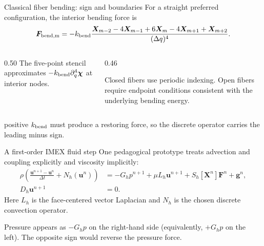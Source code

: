 \documentclass[aspectratio=169,11pt]{beamer}
\newcommand{\uvec}{\bm{u}}
\newcommand{\Xvec}{\bm{X}}
\newcommand{\Fvec}{\bm{F}}
\begin{document}
\begin{frame}{Classical fiber bending: sign and boundaries}
For a straight preferred configuration, the interior bending force is
\[
 \Fvec_{\rm bend,m}=-k_{\rm bend}
 \frac{\Xvec_{m-2}-4\Xvec_{m-1}+6\Xvec_m-4\Xvec_{m+1}+\Xvec_{m+2}}
      {(\Delta q)^4}.
\]
\begin{columns}[T,onlytextwidth]
\begin{column}{0.50\textwidth}
The five-point stencil approximates $-k_{\rm bend}\partial_q^4\boldsymbol\chi$ at interior nodes.
\end{column}
\begin{column}{0.46\textwidth}
\begin{punchbox}
Closed fibers use periodic indexing. Open fibers require endpoint conditions consistent with the underlying bending energy.
\end{punchbox}
\end{column}
\end{columns}
\medskip
{} positive $k_{\rm bend}$ must produce a restoring force, so the discrete operator carries the leading minus sign.
\end{frame}

\begin{frame}{A first-order IMEX fluid step}
One pedagogical prototype treats advection and coupling explicitly and viscosity implicitly:
\begin{align*}
  \rho\left(\frac{\uvec^{n+1}-\uvec^n}{\Delta t}
    +N_h(\uvec^n)\right)
  &=-G_hp^{n+1}+\mu L_h\uvec^{n+1}
    +S_h[\Xvec^n]\Fvec^n+\bm{g}^n,\\
  D_h\uvec^{n+1}&=0.
\end{align*}
Here $L_h$ is the face-centered vector Laplacian and $N_h$ is the chosen discrete convection operator.
\begin{punchbox}
Pressure appears as $-G_hp$ on the right-hand side (equivalently, $+G_hp$ on the left). The opposite sign would reverse the pressure force.
\end{punchbox}
\end{frame}
\end{document}
